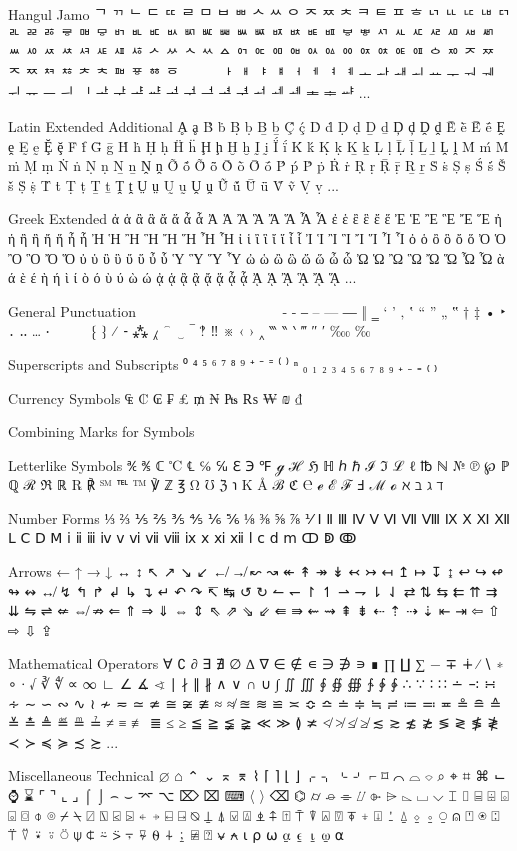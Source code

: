 \documentclass[12pt,twoside]{memoir}
\begin{document}
Hangul Jamo
ᄀ ᄁ ᄂ ᄃ ᄄ ᄅ ᄆ ᄇ ᄈ ᄉ ᄊ ᄋ ᄌ ᄍ ᄎ ᄏ ᄐ ᄑ ᄒ ᄓ ᄔ ᄕ ᄖ ᄗ ᄘ ᄙ ᄚ ᄛ ᄜ ᄝ ᄞ ᄟ ᄠ ᄡ ᄢ ᄣ ᄤ ᄥ ᄦ ᄧ ᄨ ᄩ ᄪ ᄫ ᄬ ᄭ ᄮ ᄯ ᄰ ᄱ ᄲ ᄳ ᄴ ᄵ ᄶ ᄷ ᄸ ᄹ ᄺ ᄻ ᄼ ᄽ ᄾ ᄿ ᅀ ᅁ ᅂ ᅃ ᅄ ᅅ ᅆ ᅇ ᅈ ᅉ ᅊ ᅋ ᅌ ᅍ ᅎ ᅏ ᅐ ᅑ ᅒ ᅓ ᅔ ᅕ ᅖ ᅗ ᅘ ᅙ ᅟ ᅠ ᅡ ᅢ ᅣ ᅤ ᅥ ᅦ ᅧ ᅨ ᅩ ᅪ ᅫ ᅬ ᅭ ᅮ ᅯ ᅰ ᅱ ᅲ ᅳ ᅴ ᅵ ᅶ ᅷ ᅸ ᅹ ᅺ ᅻ ᅼ ᅽ ᅾ ᅿ ᆀ ᆁ ᆂ ᆃ ᆄ ...

Latin Extended Additional
Ḁ ḁ Ḃ ḃ Ḅ ḅ Ḇ ḇ Ḉ ḉ Ḋ ḋ Ḍ ḍ Ḏ ḏ Ḑ ḑ Ḓ ḓ Ḕ ḕ Ḗ ḗ Ḙ ḙ Ḛ ḛ Ḝ ḝ Ḟ ḟ Ḡ ḡ Ḣ ḣ Ḥ ḥ Ḧ ḧ Ḩ ḩ Ḫ ḫ Ḭ ḭ Ḯ ḯ Ḱ ḱ Ḳ ḳ Ḵ ḵ Ḷ ḷ Ḹ ḹ Ḻ ḻ Ḽ ḽ Ḿ ḿ Ṁ ṁ Ṃ ṃ Ṅ ṅ Ṇ ṇ Ṉ ṉ Ṋ ṋ Ṍ ṍ Ṏ ṏ Ṑ ṑ Ṓ ṓ Ṕ ṕ Ṗ ṗ Ṙ ṙ Ṛ ṛ Ṝ ṝ Ṟ ṟ Ṡ ṡ Ṣ ṣ Ṥ ṥ Ṧ ṧ Ṩ ṩ Ṫ ṫ Ṭ ṭ Ṯ ṯ Ṱ ṱ Ṳ ṳ Ṵ ṵ Ṷ ṷ Ṹ ṹ Ṻ ṻ Ṽ ṽ Ṿ ṿ ...

Greek Extended
ἀ ἁ ἂ ἃ ἄ ἅ ἆ ἇ Ἀ Ἁ Ἂ Ἃ Ἄ Ἅ Ἆ Ἇ ἐ ἑ ἒ ἓ ἔ ἕ Ἐ Ἑ Ἒ Ἓ Ἔ Ἕ ἠ ἡ ἢ ἣ ἤ ἥ ἦ ἧ Ἠ Ἡ Ἢ Ἣ Ἤ Ἥ Ἦ Ἧ ἰ ἱ ἲ ἳ ἴ ἵ ἶ ἷ Ἰ Ἱ Ἲ Ἳ Ἴ Ἵ Ἶ Ἷ ὀ ὁ ὂ ὃ ὄ ὅ Ὀ Ὁ Ὂ Ὃ Ὄ Ὅ ὐ ὑ ὒ ὓ ὔ ὕ ὖ ὗ Ὑ Ὓ Ὕ Ὗ ὠ ὡ ὢ ὣ ὤ ὥ ὦ ὧ Ὠ Ὡ Ὢ Ὣ Ὤ Ὥ Ὦ Ὧ ὰ ά ὲ έ ὴ ή ὶ ί ὸ ό ὺ ύ ὼ ώ ᾀ ᾁ ᾂ ᾃ ᾄ ᾅ ᾆ ᾇ ᾈ ᾉ ᾊ ᾋ ᾌ ᾍ ...

General Punctuation
                      ​ ‌ ‍ ‎ ‏ ‐ ‑ ‒ – — ― ‖ ‗ ‘ ’ ‚ ‛ “ ” „ ‟ † ‡ • ‣ ․ ‥ … ‧     ‪ ‫ ‬ ‭ ‮ ‰ ‱ ′ ″ ‴ ‵ ‶ ‷ ‸ ‹ › ※ ‼ ‽ ‾ ‿ ⁀ ⁁ ⁂ ⁃ ⁄ ⁅ ⁆ ⁪ ⁫ ⁬ ⁭ ⁮ ⁯

Superscripts and Subscripts
⁰ ⁴ ⁵ ⁶ ⁷ ⁸ ⁹ ⁺ ⁻ ⁼ ⁽ ⁾ ⁿ ₀ ₁ ₂ ₃ ₄ ₅ ₆ ₇ ₈ ₉ ₊ ₋ ₌ ₍ ₎

Currency Symbols
₠ ₡ ₢ ₣ ₤ ₥ ₦ ₧ ₨ ₩ ₪ ₫

Combining Marks for Symbols
⃐ ⃑ ⃒ ⃓ ⃔ ⃕ ⃖ ⃗ ⃘ ⃙ ⃚ ⃛ ⃜ ⃝ ⃞ ⃟ ⃠ ⃡

Letterlike Symbols
℀ ℁ ℂ ℃ ℄ ℅ ℆ ℇ ℈ ℉ ℊ ℋ ℌ ℍ ℎ ℏ ℐ ℑ ℒ ℓ ℔ ℕ № ℗ ℘ ℙ ℚ ℛ ℜ ℝ ℞ ℟ ℠ ℡ ™ ℣ ℤ ℥ Ω ℧ ℨ ℩ K Å ℬ ℭ ℮ ℯ ℰ ℱ Ⅎ ℳ ℴ ℵ ℶ ℷ ℸ

Number Forms
⅓ ⅔ ⅕ ⅖ ⅗ ⅘ ⅙ ⅚ ⅛ ⅜ ⅝ ⅞ ⅟ Ⅰ Ⅱ Ⅲ Ⅳ Ⅴ Ⅵ Ⅶ Ⅷ Ⅸ Ⅹ Ⅺ Ⅻ Ⅼ Ⅽ Ⅾ Ⅿ ⅰ ⅱ ⅲ ⅳ ⅴ ⅵ ⅶ ⅷ ⅸ ⅹ ⅺ ⅻ ⅼ ⅽ ⅾ ⅿ ↀ ↁ ↂ

Arrows
← ↑ → ↓ ↔ ↕ ↖ ↗ ↘ ↙ ↚ ↛ ↜ ↝ ↞ ↟ ↠ ↡ ↢ ↣ ↤ ↥ ↦ ↧ ↨ ↩ ↪ ↫ ↬ ↭ ↮ ↯ ↰ ↱ ↲ ↳ ↴ ↵ ↶ ↷ ↸ ↹ ↺ ↻ ↼ ↽ ↾ ↿ ⇀ ⇁ ⇂ ⇃ ⇄ ⇅ ⇆ ⇇ ⇈ ⇉ ⇊ ⇋ ⇌ ⇍ ⇎ ⇏ ⇐ ⇑ ⇒ ⇓ ⇔ ⇕ ⇖ ⇗ ⇘ ⇙ ⇚ ⇛ ⇜ ⇝ ⇞ ⇟ ⇠ ⇡ ⇢ ⇣ ⇤ ⇥ ⇦ ⇧ ⇨ ⇩ ⇪

Mathematical Operators
∀ ∁ ∂ ∃ ∄ ∅ ∆ ∇ ∈ ∉ ∊ ∋ ∌ ∍ ∎ ∏ ∐ ∑ − ∓ ∔ ∕ ∖ ∗ ∘ ∙ √ ∛ ∜ ∝ ∞ ∟ ∠ ∡ ∢ ∣ ∤ ∥ ∦ ∧ ∨ ∩ ∪ ∫ ∬ ∭ ∮ ∯ ∰ ∱ ∲ ∳ ∴ ∵ ∶ ∷ ∸ ∹ ∺ ∻ ∼ ∽ ∾ ∿ ≀ ≁ ≂ ≃ ≄ ≅ ≆ ≇ ≈ ≉ ≊ ≋ ≌ ≍ ≎ ≏ ≐ ≑ ≒ ≓ ≔ ≕ ≖ ≗ ≘ ≙ ≚ ≛ ≜ ≝ ≞ ≟ ≠ ≡ ≢ ≣ ≤ ≥ ≦ ≧ ≨ ≩ ≪ ≫ ≬ ≭ ≮ ≯ ≰ ≱ ≲ ≳ ≴ ≵ ≶ ≷ ≸ ≹ ≺ ≻ ≼ ≽ ≾ ≿ ...

Miscellaneous Technical
⌀ ⌂ ⌃ ⌄ ⌅ ⌆ ⌇ ⌈ ⌉ ⌊ ⌋ ⌌ ⌍ ⌎ ⌏ ⌐ ⌑ ⌒ ⌓ ⌔ ⌕ ⌖ ⌗ ⌘ ⌙ ⌚ ⌛ ⌜ ⌝ ⌞ ⌟ ⌠ ⌡ ⌢ ⌣ ⌤ ⌥ ⌦ ⌧ ⌨ 〈 〉 ⌫ ⌬ ⌭ ⌮ ⌯ ⌰ ⌱ ⌲ ⌳ ⌴ ⌵ ⌶ ⌷ ⌸ ⌹ ⌺ ⌻ ⌼ ⌽ ⌾ ⌿ ⍀ ⍁ ⍂ ⍃ ⍄ ⍅ ⍆ ⍇ ⍈ ⍉ ⍊ ⍋ ⍌ ⍍ ⍎ ⍏ ⍐ ⍑ ⍒ ⍓ ⍔ ⍕ ⍖ ⍗ ⍘ ⍙ ⍚ ⍛ ⍜ ⍝ ⍞ ⍟ ⍠ ⍡ ⍢ ⍣ ⍤ ⍥ ⍦ ⍧ ⍨ ⍩ ⍪ ⍫ ⍬ ⍭ ⍮ ⍯ ⍰ ⍱ ⍲ ⍳ ⍴ ⍵ ⍶ ⍷ ⍸ ⍹ ⍺
\end{document}
